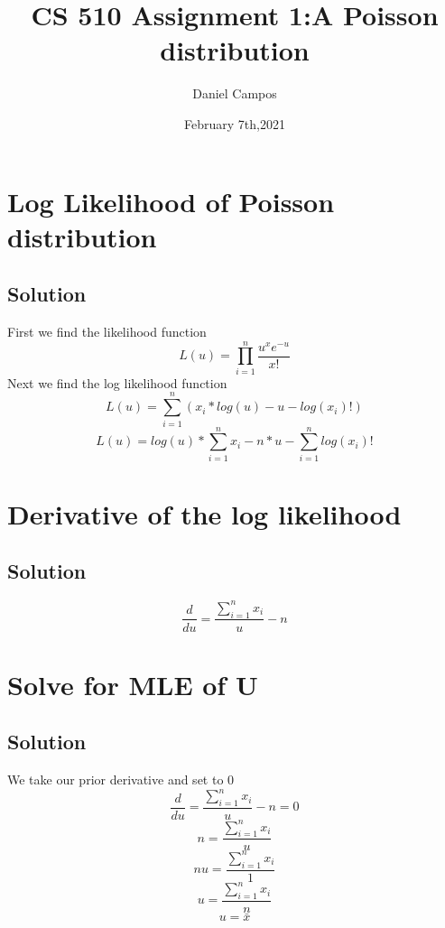 \documentclass[11pt]{article}
\title{CS 510 Assignment 1:A Poisson distribution }
\author{Daniel Campos}
\date{February 7th,2021}
\begin{document}
\maketitle
\section{Log Likelihood of Poisson distribution}
\subsection{Solution}
First we find the likelihood function
\begin{equation}
    L(u) = \prod_{i = 1}^{n} \frac{{u^x}{e^{-u}}}{x!}
\end{equation}
Next we find the log likelihood function
\begin{equation}
L(u) = \sum_{i=1}^{n} (x_i*log(u) - u - log(x_i)!)
\end{equation}
\begin{equation}
L(u) = log(u) * \sum_{i=1}^{n} x_i - n*u - \sum_{i=1}^{n} log(x_i)!
\end{equation}
\section{Derivative of the log likelihood}
\subsection{Solution}
\begin{equation}
    \frac{d}{du} = \frac{\sum_{i=1}^{n} x_i}{u} - n
\end{equation}
\section{Solve for MLE of U}
\subsection{Solution}
We take our prior derivative and set to 0 
\begin{equation}
    \frac{d}{du} = \frac{\sum_{i=1}^{n} x_i}{u} - n = 0 
\end{equation}
\begin{equation}
    n= \frac{\sum_{i=1}^{n} x_i}{u}
\end{equation}
\begin{equation}
    nu= \frac{\sum_{i=1}^{n} x_i}{1}
\end{equation}
\begin{equation}
    u= \frac{\sum_{i=1}^{n} x_i}{n}
\end{equation}
\begin{equation}
    u= \bar{x}
\end{equation}
\end{document}
